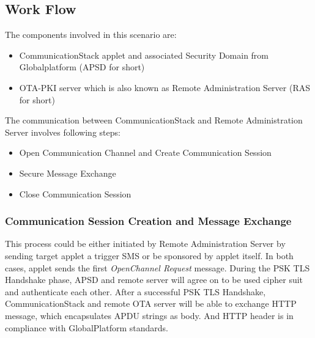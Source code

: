 \subsection {Work Flow}

The components involved in this scenario are:
 \begin{itemize}
  \item CommunicationStack applet and associated Security Domain from Globalplatform (APSD  for short)
  \item OTA-PKI server which is also known as Remote Administration Server (RAS for short)
\end{itemize}

The communication between CommunicationStack and Remote Administration Server involves following  steps:

 \begin{itemize}
  \item Open Communication Channel and Create Communication Session
  \item Secure Message Exchange
  \item Close Communication Session
\end{itemize}
\subsubsection{Communication Session Creation and Message Exchange}
This process could be either initiated by Remote Administration Server by sending target applet a trigger SMS or be sponsored by applet itself. In both cases, applet sends the first \emph{OpenChannel Request} message. During the PSK TLS Handshake phase, APSD and remote server will agree on to be used cipher suit and authenticate each other. After a successful PSK TLS Handshake, CommunicationStack and remote OTA server will be able to exchange HTTP message, which encapsulates APDU strings as body. And HTTP header is in compliance with GlobalPlatform standards.


